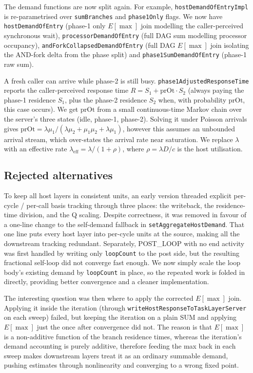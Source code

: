 The demand functions are now split again. For example, \texttt{hostDemandOfEntryImpl} is re-parametrised over \texttt{sumBranches} and \texttt{phase1Only} flags. We now have \texttt{hostDemandOfEntry} (phase-1 only $E[\max]$ join modelling the caller-perceived synchronous wait), \texttt{processorDemandOfEntry} (full DAG sum modelling processor occupancy), \texttt{andForkCollapsedDemandOfEntry} (full DAG $E[\max]$ join isolating the AND-fork delta from the phase split) and \texttt{phase1SumDemandOfEntry} (phase-1 raw sum).

A fresh caller can arrive while phase-2 is still busy. \texttt{phase1AdjustedResponseTime} reports the caller-perceived response time $R = S_1 + \text{prOt} \cdot S_2$ (always paying the phase-1 residence $S_1$, plus the phase-2 residence $S_2$ when, with probability $\text{prOt}$, this case occurs). We get $\text{prOt}$ from a small continuous-time Markov chain over the server's three states (idle, phase-1, phase-2). Solving it under Poisson arrivals gives $\text{prOt} = \lambda \mu_1 / (\lambda \mu_2 + \mu_1 \mu_2 + \lambda \mu_1)$, however this assumes an unbounded arrival stream, which over-states the arrival rate near saturation. We replace $\lambda$ with an effective rate $\lambda_{\text{eff}} = \lambda / (1 + \rho)$, where $\rho = \lambda D / c$ is the host utilisation.

\subsection{Rejected alternatives}

To keep all host layers in consistent units, an early version threaded explicit per-cycle / per-call basis tracking through three places: the writeback, the residence-time division, and the Q scaling. Despite correctness, it was removed in favour of a one-line change to the self-demand fallback in \texttt{setAggregateHostDemand}. That one line puts every host layer into per-cycle units at the source, making all the downstream tracking redundant. Separately, POST\_LOOP with no end activity was first handled by writing only \texttt{loopCount} to the post side, but the resulting fractional self-loop did not converge fast enough. We now simply scale the loop body's existing demand by \texttt{loopCount} in place, so the repeated work is folded in directly, providing better convergence and a cleaner implementation.

The interesting question was then where to apply the corrected $E[\max]$ join. Applying it inside the iteration (through \texttt{writeHostResponseToTaskLayerServer} on each sweep) failed, but keeping the iteration on a plain SUM and applying $E[\max]$ just the once after convergence did not. The reason is that $E[\max]$ is a non-additive function of the branch residence times, whereas the iteration's demand accounting is purely additive, therefore feeding the max back in each sweep makes downstream layers treat it as an ordinary summable demand, pushing estimates through nonlinearity and converging to a wrong fixed point. 

